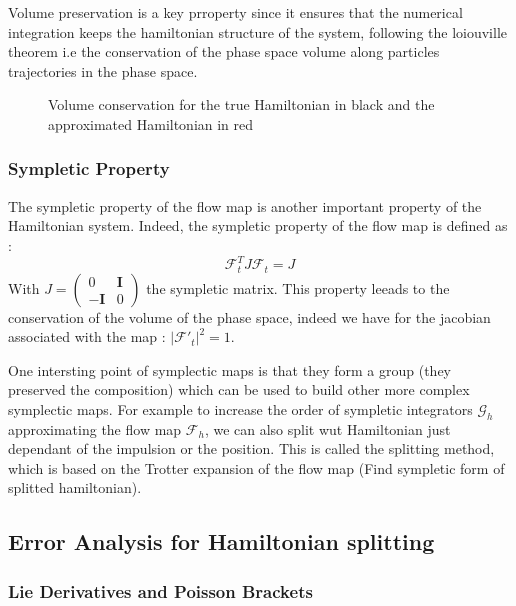 \documentclass[ansiapaper]{report}
\begin{document}
\begin{multicols}{3}
  Volume preservation is a key prroperty since it ensures that the numerical integration keeps the hamiltonian structure of the system, following the loiouville theorem i.e the conservation of the phase space volume along particles trajectories in the phase space.

  \begin{figure}[H]
    \def\svgwidth{\linewidth}
    
    \caption{Volume conservation for the true Hamiltonian in black and the approximated Hamiltonian in red}
    \vspace{0.15cm}
  \end{figure}

  \subsubsection{Sympletic Property}
  The sympletic property of the flow map is another important property of the Hamiltonian system. Indeed, the sympletic property of the flow map is defined as :
  $$ \mathcal{F}_t^T J \mathcal{F}_t = J$$
  With $J = \begin{pmatrix}
      0           & \textbf{I} \\
      -\textbf{I} & 0
    \end{pmatrix}$ the sympletic matrix. This property leeads to the conservation of the volume of the phase space, indeed we have  for the jacobian associated with the map : $\lvert \mathcal{F'}_t\rvert^2 = 1 $.

  One intersting point of symplectic maps is that they form a group (they preserved the composition) which can be used to build other more complex symplectic maps. For example to increase the order of sympletic integrators $\mathcal{G}_h$  approximating the flow map $\mathcal{F}_h$, we can also split wut Hamiltonian just dependant of the impulsion or the position. This is called the splitting method, which is based on the Trotter expansion of the flow map (Find sympletic form of splitted hamiltonian).

  \subsection{Error Analysis for Hamiltonian splitting}


  \subsubsection{Lie Derivatives and Poisson Brackets}


\end{multicols}
\end{document}
